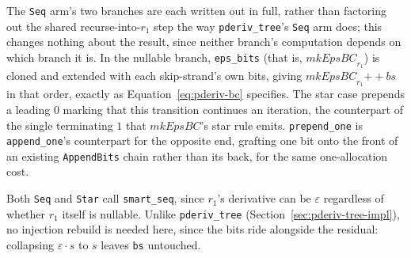 The \texttt{Seq} arm's two branches are each written out in full,
rather than factoring out the shared recurse-into-$r_1$ step
the way \texttt{pderiv\_tree}'s \texttt{Seq} arm does;
this changes nothing about the result, since neither branch's computation
depends on which branch it is.
In the nullable branch, \texttt{eps\_bits} (that is, $\mathit{mkEpsBC}_{r_1}$)
is cloned and extended with each skip-strand's own bits,
giving $\mathit{mkEpsBC}_{r_1} \mathbin{+\!\!+} bs$ in that order,
exactly as Equation~\eqref{eq:pderiv-bc} specifies.
The star case prepends a leading $0$ marking that this
transition continues an iteration, the counterpart of the single
terminating $1$ that $\mathit{mkEpsBC}$'s star rule emits.
\texttt{prepend\_one} is \texttt{append\_one}'s counterpart for the
opposite end, grafting one bit onto the front of an existing
\texttt{AppendBits} chain rather than its back, for the same
one-allocation cost.

Both \texttt{Seq} and \texttt{Star} call \texttt{smart\_seq},
since $r_1$'s derivative can be $\varepsilon$
regardless of whether $r_1$ itself is nullable.
Unlike \texttt{pderiv\_tree} (Section~\ref{sec:pderiv-tree-impl}),
no injection rebuild is needed here, since the bits ride alongside the
residual: collapsing $\varepsilon \cdot s$ to $s$ leaves \texttt{bs} untouched.

